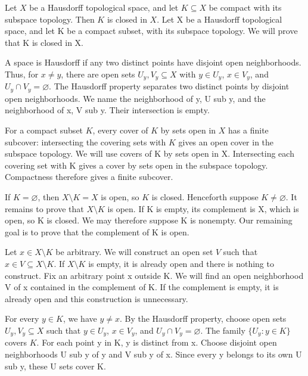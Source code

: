 \documentclass{article}
\begin{document}

{Let $X$ be a Hausdorff topological space, and let $K\subseteq X$ be compact with its subspace topology. Then $K$ is closed in $X$.}
{Let X be a Hausdorff topological space, and let K be a compact subset, with its subspace topology. We will prove that K is closed in X.}

{A space is Hausdorff if any two distinct points have disjoint open neighborhoods. Thus, for $x\ne y$, there are open sets $U_y,V_y\subseteq X$ with $y\in U_y$, $x\in V_y$, and $U_y\cap V_y=\varnothing$.}
{The Hausdorff property separates two distinct points by disjoint open neighborhoods. We name the neighborhood of y, U sub y, and the neighborhood of x, V sub y. Their intersection is empty.}

{For a compact subset $K$, every cover of $K$ by sets open in $X$ has a finite subcover: intersecting the covering sets with $K$ gives an open cover in the subspace topology.}
{We will use covers of K by sets open in X. Intersecting each covering set with K gives a cover by sets open in the subspace topology. Compactness therefore gives a finite subcover.}

{If $K=\varnothing$, then $X\setminus K=X$ is open, so $K$ is closed. Henceforth suppose $K\ne\varnothing$. It remains to prove that $X\setminus K$ is open.}
{If K is empty, its complement is X, which is open, so K is closed. We may therefore suppose K is nonempty. Our remaining goal is to prove that the complement of K is open.}

{Let $x\in X\setminus K$ be arbitrary. We will construct an open set $V$ such that $x\in V\subseteq X\setminus K$. If $X\setminus K$ is empty, it is already open and there is nothing to construct.}
{Fix an arbitrary point x outside K. We will find an open neighborhood V of x contained in the complement of K. If the complement is empty, it is already open and this construction is unnecessary.}

{For every $y\in K$, we have $y\ne x$. By the Hausdorff property, choose open sets $U_y,V_y\subseteq X$ such that $y\in U_y$, $x\in V_y$, and $U_y\cap V_y=\varnothing$. The family $\{U_y:y\in K\}$ covers $K$.}
{For each point y in K, y is distinct from x. Choose disjoint open neighborhoods U sub y of y and V sub y of x. Since every y belongs to its own U sub y, these U sets cover K.}
\end{document}
